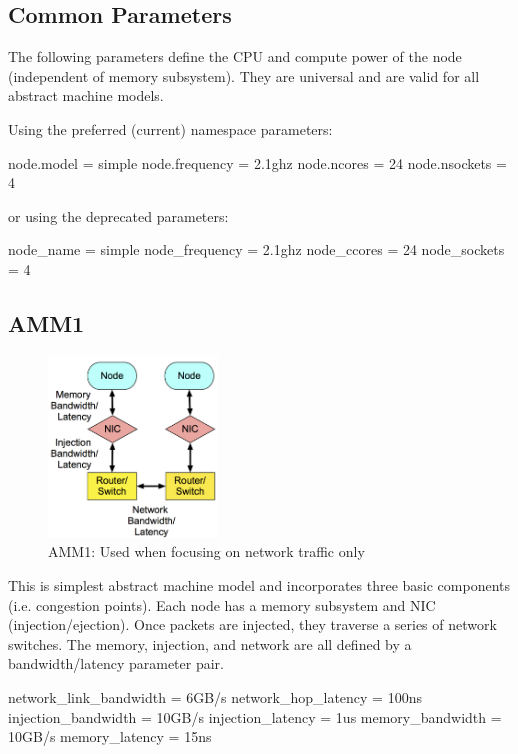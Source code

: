 \subsection{Common Parameters}
\label{subsec:commonParams}
The following parameters define the CPU and compute power of the node (independent of memory subsystem).
They are universal and are valid for all abstract machine models.

Using the preferred (current) namespace parameters:
\begin{ViFile}
node.model = simple
node.frequency = 2.1ghz
node.ncores = 24
node.nsockets = 4
\end{ViFile}

or using the deprecated parameters:
\begin{ViFile}
node_name = simple
node_frequency = 2.1ghz
node_ccores = 24
node_sockets = 4
\end{ViFile}

\subsection{AMM1}
\label{subsec:ammOne}

\begin{figure}[h!]
\begin{center}
\includegraphics[width=0.4\textwidth]{figures/amm/AMM1.png}
\end{center}
\caption{AMM1: Used when focusing on network traffic only}
\label{fig:amm1}
\end{figure}

This is simplest abstract machine model and incorporates three basic components (i.e. congestion points).
Each node has a memory subsystem and NIC (injection/ejection).
Once packets are injected, they traverse a series of network switches.
The memory, injection, and network are all defined by a bandwidth/latency parameter pair.

\begin{ViFile}
network_link_bandwidth = 6GB/s
network_hop_latency = 100ns
injection_bandwidth = 10GB/s
injection_latency = 1us
memory_bandwidth = 10GB/s
memory_latency = 15ns
\end{ViFile}

